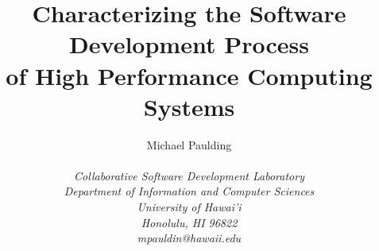 \documentclass[11pt,twocolumn]{article}
\begin{document}
\title{Characterizing the Software Development Process \\
of High Performance Computing Systems}


\author{\protect\begin{tabular}{ccc}
Michael Paulding \\
\end{tabular}\\
\em  Collaborative Software Development Laboratory \\
\em  Department of Information and Computer Sciences \\
\em  University of Hawai'i \\
\em  Honolulu, HI 96822 \\
\em  mpauldin@hawaii.edu}
\maketitle
\thispagestyle{empty}
\end{document}
